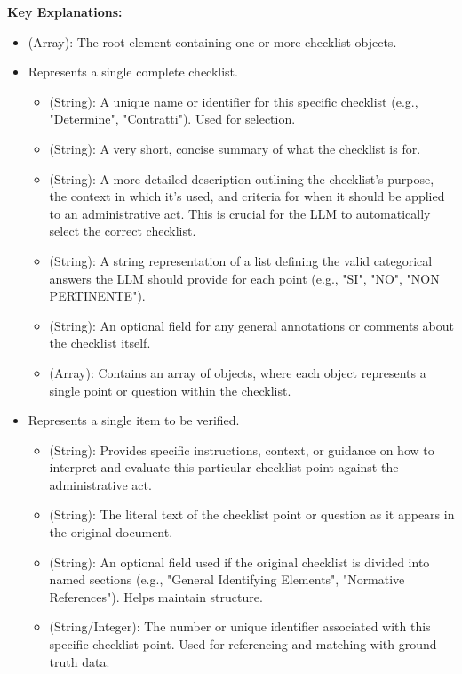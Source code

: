 \documentclass[../main.tex]{subfiles}
\begin{document}
\textbf{Key Explanations:}

\begin{itemize}
    \item {} (Array): The root element containing one or more checklist objects.
    \item {} Represents a single complete checklist.
    \begin{itemize}
        \item {} (String): A unique name or identifier for this specific checklist (e.g., "Determine", "Contratti"). Used for selection.
        \item {} (String): A very short, concise summary of what the checklist is for.
        \item {} (String): A more detailed description outlining the checklist's purpose, the context in which it's used, and criteria for when it should be applied to an administrative act. This is crucial for the LLM to automatically select the correct checklist.
        \item {} (String): A string representation of a list defining the valid categorical answers the LLM should provide for each point (e.g., "SI", "NO", "NON PERTINENTE").
        \item {} (String): An optional field for any general annotations or comments about the checklist itself.
        \item {} (Array): Contains an array of objects, where each object represents a single point or question within the checklist.
    \end{itemize}
    \item {} Represents a single item to be verified.
    \begin{itemize}
        \item {} (String): Provides specific instructions, context, or guidance on how to interpret and evaluate this particular checklist point against the administrative act.
        \item {} (String): The literal text of the checklist point or question as it appears in the original document.
        \item {} (String): An optional field used if the original checklist is divided into named sections (e.g., "General Identifying Elements", "Normative References"). Helps maintain structure.
        \item {} (String/Integer): The number or unique identifier associated with this specific checklist point. Used for referencing and matching with ground truth data.
    \end{itemize}
\end{itemize}

\newpage
 



\newpage


\end{document}
